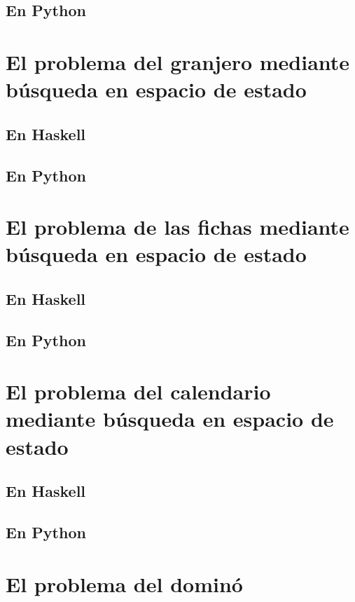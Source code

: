 \documentclass[a4paper,12pt,twoside]{book}
\begin{document}
\subsection{En Python}

\section{El problema del granjero mediante búsqueda en espacio de estado}
\subsection{En Haskell}
\subsection{En Python}

\section{El problema de las fichas mediante búsqueda en espacio de estado}
\subsection{En Haskell}
\subsection{En Python}

\section{El problema del calendario mediante búsqueda en espacio de estado}
\subsection{En Haskell}
\subsection{En Python}

\section{El problema del dominó}
\end{document}
